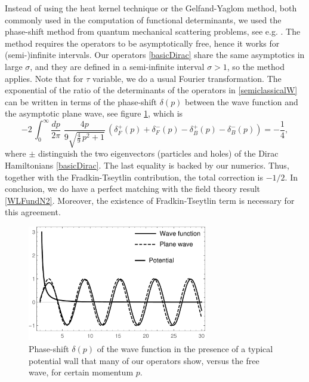 Instead of using the heat kernel technique or the Gelfand-Yaglom method, 
both commonly used in the computation of functional determinants,
we used the phase-shift method from quantum mechanical scattering problems, see e.g. \cite{PhysRevD.10.4130}.
The method requires the operators to be asymptotically free, hence it works for (semi-)infinite intervals.
Our operators \eqref{basicDirac} share the same asymptotics in large $\sigma$, and they are defined in a semi-infinite interval $\sigma>1$,
so the method applies. Note that for $\tau$ variable, we do a usual Fourier transformation. 
The exponential of the ratio of the determinants of the operators in \eqref{semiclassicalW}
can be written in terms of the phase-shift $\delta(p)$ between the wave function and the asymptotic plane wave, 
see figure \ref{fig:potentialWavesPlot},
which is
\begin{equation}\label{deltaphases}    
 -2 \, \int_{0}^{\infty }\frac{dp}{2\pi }\,\,
 \frac{4 p }{9\sqrt{\frac{4}{9}\,p^2+1}}\,\left(
 \delta_F ^+(p)
 +
\delta_F ^-(p)
-\delta_B ^+(p)
 -
\delta_B^-(p)
\right) = -\dfrac{1}{4},
\end{equation}
where $\pm$ distinguish the two eigenvectors (particles and holes) of the Dirac Hamiltonians \eqref{basicDirac}.
The last equality is backed by our numerics.
Thus, together with the Fradkin-Tseytlin contribution, the total correction is $-1/2$. 
In conclusion, we do have a perfect matching with the field theory result \eqref{WLFundN2}.
Moreover, the existence of Fradkin-Tseytlin term is necessary for this agreement.




\begin{figure}[t]
\begin{center}
\includegraphics[width=0.7\textwidth]{Images/potentialWavesPlotBlack.pdf}
\end{center}
\caption{\label{fig:potentialWavesPlot} Phase-shift $\delta(p)$ of the wave function 
in the presence of a typical potential wall that many of our operators show, versus the free wave, 
for certain momentum $p$. 
}
\end{figure}


